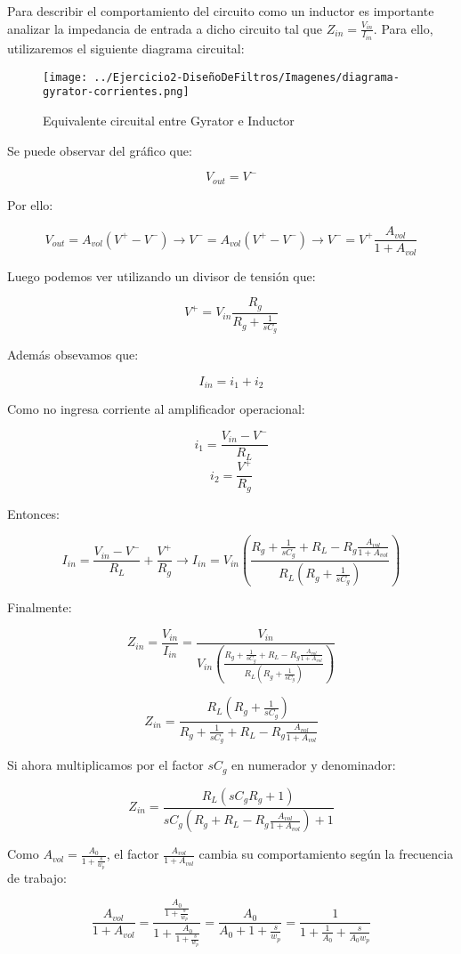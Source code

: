 Para describir el comportamiento del circuito como un inductor es importante 
analizar la impedancia de entrada a dicho circuito tal que $Z_{in}=\frac{V_{in}}{I_{in}}$. 
Para ello, utilizaremos el siguiente diagrama circuital:

\begin{figure}[H]
    \centering
    \texttt{[image: ../Ejercicio2-DiseñoDeFiltros/Imagenes/diagrama-gyrator-corrientes.png]}
    \caption{Equivalente circuital entre Gyrator e Inductor}
\end{figure}

Se puede observar del gráfico que:

$$V_{out}=V^-$$

Por ello:

$$V_{out}=A_{vol}(V^+-V^-) \longrightarrow V^-=A_{vol}(V^+-V^-) 
\longrightarrow V^-= V^+ \frac{A_{vol}}{1+A_{vol}}$$

Luego podemos ver utilizando un divisor de tensión que:

$$V^+= V_{in}\frac{R_g}{R_g+\frac{1}{sC_g}}$$

Además obsevamos que:

$$I_{in}=i_1+i_2$$

Como no ingresa corriente al amplificador operacional:

$$i_1=\frac{V_{in}-V^-}{R_L}$$
$$i_2=\frac{V^+}{R_g}$$

Entonces:

$$I_{in}=\frac{V_{in}-V^-}{R_L}+\frac{V^+}{R_g} \longrightarrow 
I_{in}=V_{in}(\frac{R_g+\frac{1}{sC_g}+R_L-R_g\frac{A_{vol}}{1+A_{vol}}}{R_L(R_g+\frac{1}{sC_g})})$$

Finalmente:

$$Z_{in}=\frac{V_{in}}{I_{in}}=\frac{V_{in}}{V_{in}(\frac{R_g+\frac{1}{sC_g}+R_L-R_g\frac{A_{vol}}{1+A_{vol}}}{R_L(R_g+\frac{1}{sC_g})})}$$

$$Z_{in}=\frac{R_L(R_g+\frac{1}{sC_g})}{R_g+\frac{1}{sC_g}+R_L-R_g\frac{A_{vol}}{1+A_{vol}}}$$

Si ahora multiplicamos por el factor $sC_g$ en numerador y denominador:

$$Z_{in}=\frac{R_L(sC_gR_g+1)}{sC_g(R_g+R_L-R_g\frac{A_{vol}}{1+A_{vol}})+1}$$

Como $A_{vol}=\frac{A_0}{1+\frac{s}{w_p}}$, el factor $\frac{A_{vol}}{1+A_{vol}}$ cambia su comportamiento
según la frecuencia de trabajo:

$$\frac{A_{vol}}{1+A_{vol}}=\frac{\frac{A_0}{1+\frac{s}{w_p}}}{1+\frac{A_0}{1+\frac{s}{w_p}}}=
\frac{A_0}{A_0+1+\frac{s}{w_p}}=\frac{1}{1+\frac{1}{A_0}+\frac{s}{A_0w_p}}$$

